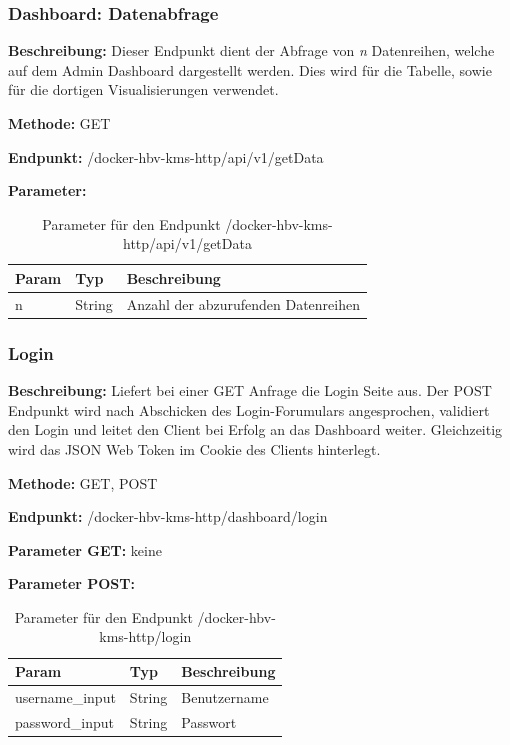 \subsubsection{Dashboard: Datenabfrage}
\label{sec:routes-dashboard-query}
\textbf{Beschreibung:} Dieser Endpunkt dient der Abfrage von \textit{n} Datenreihen, welche auf dem Admin Dashboard dargestellt werden. Dies wird für die Tabelle, sowie für die dortigen Visualisierungen verwendet.

\textbf{Methode:} GET

\textbf{Endpunkt:} /docker-hbv-kms-http/api/v1/getData

\textbf{Parameter:}
\begin{table}[H]
    \label{table:/docker-hbv-kms-http/api/v1/getData}
    \caption{Parameter für den Endpunkt /docker-hbv-kms-http/api/v1/getData}
    \setlength{\tabcolsep}{3pt}
    \begin{tabular}{p{100pt}p{80pt}p{200pt}}
        \toprule
        Param & Typ    & Beschreibung                        \\
        \midrule
        n     & String & Anzahl der abzurufenden Datenreihen \\
        \bottomrule
    \end{tabular}
\end{table}
\dotfill

\subsubsection{Login}
\label{sec:routes-login}
\textbf{Beschreibung:} Liefert bei einer GET Anfrage die Login Seite aus. Der POST Endpunkt wird nach Abschicken des Login-Forumulars angesprochen, validiert den Login und leitet den Client bei Erfolg an das Dashboard weiter. Gleichzeitig wird das JSON Web Token im Cookie des Clients hinterlegt.

\textbf{Methode:} GET, POST

\textbf{Endpunkt:} /docker-hbv-kms-http/dashboard/login

\textbf{Parameter GET:} keine

\textbf{Parameter POST:}
\begin{table}[H]
    \label{table:/docker-hbv-kms-http/login}
    \caption{Parameter für den Endpunkt /docker-hbv-kms-http/login}
    \setlength{\tabcolsep}{3pt}
    \begin{tabular}{p{100pt}p{80pt}p{200pt}}
        \toprule
        Param           & Typ    & Beschreibung \\
        \midrule
        username\_input & String & Benutzername \\
        password\_input & String & Passwort     \\
        \bottomrule
    \end{tabular}
\end{table}
\dotfill

